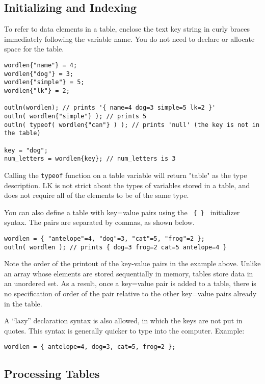 \documentclass{article}
\begin{document}
\subsection{Initializing and Indexing}

To refer to data elements in a table, enclose the text key string in curly braces immediately following the variable name.  You do not need to declare or allocate space for the table.  

\begin{verbatim}
wordlen{"name"} = 4;
wordlen{"dog"} = 3;
wordlen{"simple"} = 5;
wordlen{"lk"} = 2;

outln(wordlen); // prints '{ name=4 dog=3 simple=5 lk=2 }'
outln( wordlen{"simple"} ); // prints 5
outln( typeof( wordlen{"can"} ) ); // prints 'null' (the key is not in the table)

key = "dog";
num_letters = wordlen{key}; // num_letters is 3
\end{verbatim}

Calling the \texttt{typeof} function on a table variable will return "table" as the type description.  LK is not strict about the types of variables stored in a table, and does not require all of the elements to be of the same type.

You can also define a table with key=value pairs using the \texttt{ \{ \} } initializer syntax.  The pairs are separated by commas, as shown below.

\begin{verbatim}
wordlen = { "antelope"=4, "dog"=3, "cat"=5, "frog"=2 };
outln( wordlen ); // prints { dog=3 frog=2 cat=5 antelope=4 }
\end{verbatim}

Note the order of the printout of the key-value pairs in the example above.  Unlike an array whose elements are stored sequentially in memory, tables store data in an unordered set.  As a result, once a key=value pair is added to a table, there is no specification of order of the pair relative to the other key=value pairs already in the table.

A ``lazy'' declaration syntax is also allowed, in which the keys are not put in quotes.  This syntax is generally quicker to type into the computer.  Example:

\begin{verbatim}
wordlen = { antelope=4, dog=3, cat=5, frog=2 };
\end{verbatim}




\subsection{Processing Tables}
\end{document}
